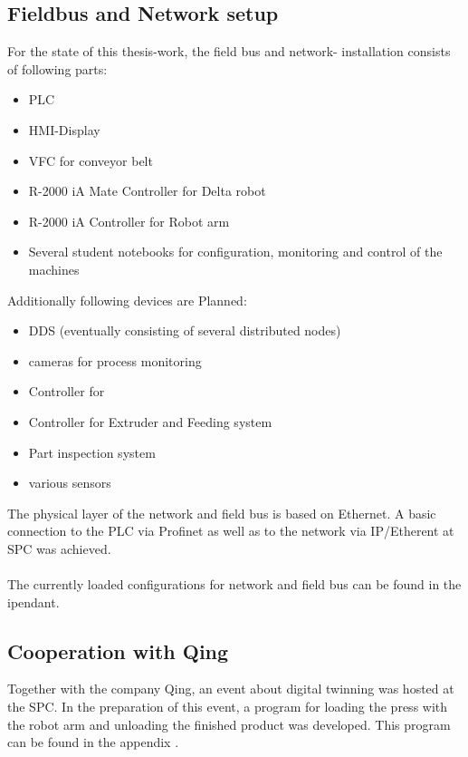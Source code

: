\subsection{Fieldbus and Network setup}

For the state of this thesis-work, the field bus and network- installation consists of following parts:
\begin{itemize}
	\item \ac{PLC}
	\item \ac{HMI}-Display
	\item \ac{VFC} for conveyor belt
	\item R-2000 iA Mate Controller for Delta robot
	\item R-2000 iA Controller for Robot arm
	\item Several student notebooks for configuration, monitoring and control of the machines
\end{itemize}

Additionally following devices are Planned:
\begin{itemize}
	\item \ac{DDS} (eventually consisting of several distributed nodes)
	\item cameras for process monitoring 
	\item Controller for 
	\item Controller for Extruder and Feeding system
	\item Part inspection system
	\item various sensors
\end{itemize}

The physical layer of the network and field bus is based on Ethernet. A basic connection to the PLC via Profinet as well as to the network via IP/Etherent at \ac{SPC} was achieved.\\
\\
The currently loaded configurations for network and field bus can be found in the \ac{ipendant}.

\subsection{Cooperation with Qing}
Together with the company Qing, an event about digital twinning was hosted at the \ac{SPC}. In the preparation of this event, a program for loading the press with the robot arm and unloading the finished product was developed. This program can be found in the appendix .